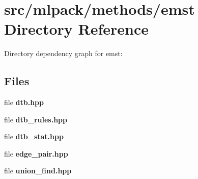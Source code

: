 \section{src/mlpack/methods/emst Directory Reference}
\label{dir_d0709e3ee5c6e2a5853648e662601af2}
Directory dependency graph for emst\-:
\subsection*{Files}
\begin{DoxyCompactItemize}
\item 
file {\bf dtb.\-hpp}
\item 
file {\bf dtb\-\_\-rules.\-hpp}
\item 
file {\bf dtb\-\_\-stat.\-hpp}
\item 
file {\bf edge\-\_\-pair.\-hpp}
\item 
file {\bf union\-\_\-find.\-hpp}
\end{DoxyCompactItemize}
